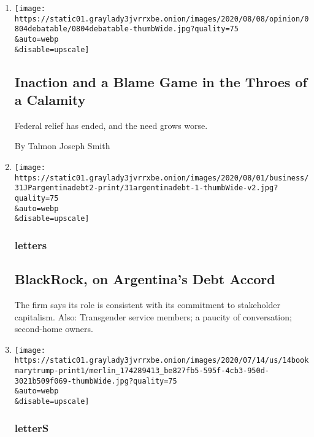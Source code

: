 \begin{enumerate}
\def\labelenumi{\arabic{enumi}.}
\item
  \href{/2020/08/04/opinion/coronavirus-federal-relief-inaction-debatable.html}{}

  \texttt{[image: https://static01.graylady3jvrrxbe.onion/images/2020/08/08/opinion/0804debatable/0804debatable-thumbWide.jpg?quality=75\\\&auto=webp\\\&disable=upscale]}

  \hypertarget{inaction-and-a-blame-game-in-the-throes-of-a-calamity}{%
  \subsection{Inaction and a Blame Game in the Throes of a
  Calamity}\label{inaction-and-a-blame-game-in-the-throes-of-a-calamity}}

  Federal relief has ended, and the need grows worse.

  By Talmon Joseph Smith
\item
  \href{/2020/08/04/opinion/letters/blackrock-argentina.html}{}

  \texttt{[image: https://static01.graylady3jvrrxbe.onion/images/2020/08/01/business/31JPargentinadebt2-print/31argentinadebt-1-thumbWide-v2.jpg?quality=75\\\&auto=webp\\\&disable=upscale]}

  \hypertarget{letters}{%
  \subsubsection{letters}\label{letters}}

  \hypertarget{blackrock-on-argentinas-debt-accord}{%
  \subsection{BlackRock, on Argentina's Debt
  Accord}\label{blackrock-on-argentinas-debt-accord}}

  The firm says its role is consistent with its commitment to
  stakeholder capitalism. Also: Transgender service members; a paucity
  of conversation; second-home owners.
\item
  \href{/2020/08/04/opinion/letters/trump-family.html}{}

  \texttt{[image: https://static01.graylady3jvrrxbe.onion/images/2020/07/14/us/14bookmarytrump-print1/merlin\_174289413\_be827fb5-595f-4cb3-950d-3021b509f069-thumbWide.jpg?quality=75\\\&auto=webp\\\&disable=upscale]}

  \hypertarget{letters-1}{%
  \subsubsection{letterS}\label{letters-1}}


\end{enumerate}
